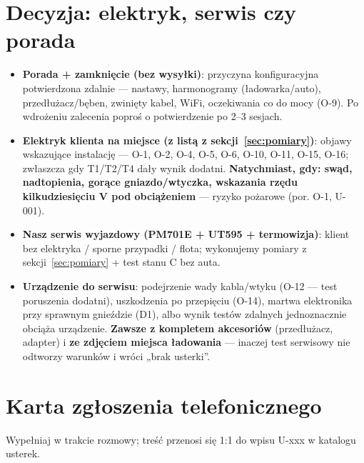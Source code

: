 \documentclass[11pt]{article}
\newcommand{\key}[1]{\textbf{\color{navy}#1}}
\newcommand{\warn}[1]{\textbf{\color{warnred}#1}}
\begin{document}
\section{Decyzja: elektryk, serwis czy porada}\label{sec:decyzja}
\begin{itemize}
\item \key{Porada + zamknięcie (bez wysyłki)}: przyczyna konfiguracyjna potwierdzona zdalnie — nastawy, harmonogramy (ładowarka/auto), przedłużacz/bęben, zwinięty kabel, WiFi, oczekiwania co do mocy (O-9). Po wdrożeniu zalecenia poproś o potwierdzenie po 2--3 sesjach.
\item \key{Elektryk klienta na miejsce (z listą z sekcji~\ref{sec:pomiary})}: objawy wskazujące instalację — O-1, O-2, O-4, O-5, O-6, O-10, O-11, O-15, O-16; zwłaszcza gdy T1/T2/T4 dały wynik dodatni. \warn{Natychmiast, gdy: swąd, nadtopienia, gorące gniazdo/wtyczka, wskazania rzędu kilkudziesięciu V pod obciążeniem} — ryzyko pożarowe (por. O-1, U-001).
\item \key{Nasz serwis wyjazdowy (PM701E + UT595 + termowizja)}: klient bez elektryka / sporne przypadki / flota; wykonujemy pomiary z sekcji~\ref{sec:pomiary} + test stanu C bez auta.
\item \key{Urządzenie do serwisu}: podejrzenie wady kabla/wtyku (O-12 — test poruszenia dodatni), uszkodzenia po przepięciu (O-14), martwa elektronika przy sprawnym gnieździe (D1), albo wynik testów zdalnych jednoznacznie obciąża urządzenie. \key{Zawsze z kompletem akcesoriów} (przedłużacz, adapter) i \key{ze zdjęciem miejsca ładowania} — inaczej test serwisowy nie odtworzy warunków i wróci „brak usterki''.
\end{itemize}

\section{Karta zgłoszenia telefonicznego}\label{sec:karta}
Wypełniaj w trakcie rozmowy; treść przenosi się 1:1 do wpisu U-xxx w katalogu usterek.
\end{document}
